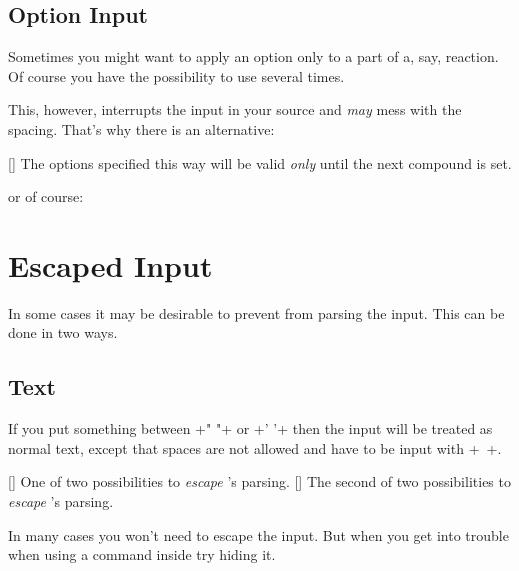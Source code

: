 \documentclass[load-preamble+]{cnltx-doc}
\begin{document}
\subsection{Option Input}
Sometimes you might want to apply an option only to a part of a, say,
reaction.  Of course you have the possibility to use  several times.
\begin{example}
  \textcolor{red}{} \par
\end{example}
This, however, interrupts the input in your source and \emph{may} mess with
the spacing. That's why there is an alternative:
\begin{commands}
  []
    The options specified this way will be valid \emph{only} until the next
    compound is set.
\end{commands}
\begin{example}
  \textcolor{red}{} \par
   \par
  or of course:\par
  \par\bigskip
   \par
\end{example}

\section{Escaped Input}
In some cases it may be desirable to prevent \chemformula{} from parsing the
input.  This can be done in two ways.

\subsection{Text}\label{ssec:text}
If you put something between \verbcode+" "+ or \verbcode+' '+ then the input
will be treated as normal text, except that spaces are not allowed and have to
be input with \verbcode+~+.
\begin{commands}
  []
    One of two possibilities to \emph{escape} \chemformula's parsing.
  []
    The second of two possibilities to \emph{escape} \chemformula's parsing.
\end{commands}
\begin{example}
   \par
   \par
\end{example}
In many cases you won't need to escape the input.  But when you get into
trouble when using a command inside  try hiding it.
\end{document}
